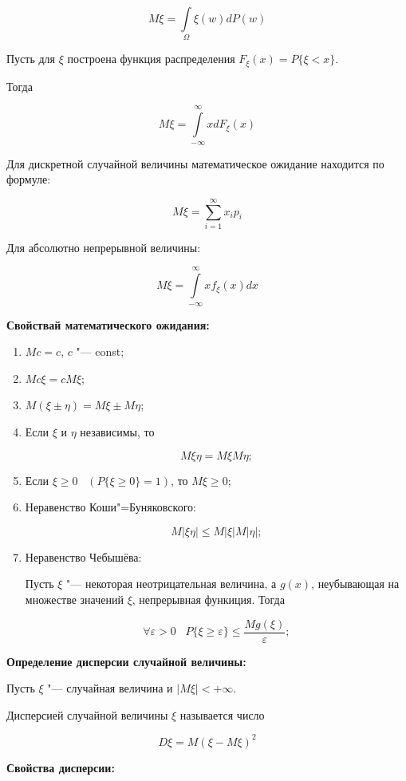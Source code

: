 \[
    M\xi = \int\limits_{\Omega} \xi(w) d P(w)  
\]

Пусть для $\xi$ построена функция распределения $F_{\xi}(x) =
P\{\xi < x\}$.

Тогда

\[
    M\xi = \int\limits^{\infty}_{-\infty}  x d F_{\xi} (x)  
\]

Для дискретной случайной величины математическое ожидание 
находится по формуле:

\[
    M\xi = \sum^{\infty}_{i = 1} x_i p_i  
\]

Для абсолютно непрерывной величины:

\[
    M\xi = \int\limits^{\infty}_{-\infty} x f_{\xi} (x) dx  
\]

\textbf{Свойствай математического ожидания:}
\smallskip    

\begin{enumerate}
    \item{$Mc = c$, $c$ "--- const;}
    \item{$Mc\xi = cM\xi$;}
    \item{$M(\xi \pm \eta) = M\xi \pm M\eta$;}
    \item{Если $\xi$ и $\eta$ независимы, то 
    
    \[
        M\xi\eta = M\xi M\eta;   
    \]
    }
    \item{Если $\xi \geq 0 \;\;\; (P\{\xi \geq 0\} = 1)$, то
    $M\xi \geq 0$;}
    \item{Неравенство Коши"=Буняковского:
    
    \[
        M|\xi\eta| \leq M|\xi|M|\eta|;  
    \]
    }
    \item{Неравенство Чебышёва:
    
    Пусть $\xi$ "--- некоторая неотрицательная величина,
    а $g(x)$, неубывающая на множестве значений $\xi$, 
    непрерывная функиция. Тогда
    
    \[
        \forall \varepsilon > 0 \;\;\; P\{\xi \geq \varepsilon\} \leq
        \frac{Mg(\xi)}{\varepsilon};
    \]
    }
\end{enumerate}

\textbf{Определение дисперсии случайной величины:}
\smallskip

Пусть $\xi$ "--- случайная величина и $|M\xi| < +\infty$.
\bigskip

Дисперсией случайной величины $\xi$ называется число 

\[
D\xi = M(\xi - M\xi)^2
\]

\textbf{Свойства дисперсии:}
\smallskip

